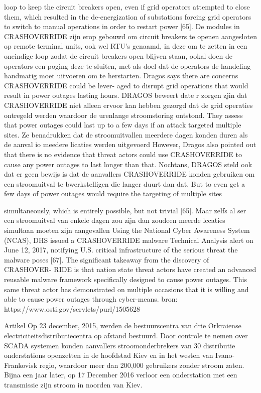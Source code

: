 {loop to keep the circuit breakers open, even if grid operators attempted
to close them, which resulted in the de-energization of substations forcing
grid operators to switch to manual operations in order to restart power
[65]. De modules in CRASHOVERRIDE zijn erop gebouwd om circuit breakers te openen
aangesloten op remote terminal units, ook wel RTU’s genaamd, in deze om te zetten in een
oneindige loop zodat de circuit breakers open blijven staan, ookal doen de operators een
poging deze te sluiten, met als doel dat de operators de handeling handmatig moet uitvoeren
om te herstarten.
Dragos says there are concerns CRASHOVERRIDE could be lever-
aged to disrupt grid operations that would result in power outages lasting
hours. DRAGOS beweert date r zorgen zjin dat CRASHOVERRIDE niet alleen ervoor kan
hebben gezorgd dat de grid operaties ontregeld werden waardoor de urenlange
stroomstoring ontstond.
They assess that power outages could last up to a few days if an attack targeted multiple
sites. Ze benadrukken dat de stroomuitvallen meerdere dagen konden duren als de aanval io
meedere licaties werden uitgevoerd
However, Dragos also pointed out that there is no evidence that threat actors could use
CRASHOVERRIDE to cause any power outages to last longer than that. Nochtans,
DRAGOS steld ook dat er geen bewijs is dat de aanvallers CRASHOVERRIDE konden
gebruiken om een stroomuitval te bwerkstelligen die langer duurt dan dat.
But to even get a few days of power outages would require the targeting of multiple sites

simultaneously, which is entirely possible, but not trivial [65]. Maar zelfs al ser een
stroomuitval van enkele dagen zou zijn dan zoudeen meerde lccaties simultaan moeten zijn
aangevallen
Using the National Cyber Awareness System (NCAS), DHS issued a
CRASHOVERRIDE malware Technical Analysis alert on June 12, 2017, notifying U.S. critical
infrastructure of the serious threat the malware poses [67].
The significant takeaway from the discovery of CRASHOVER-
RIDE is that nation state threat actors have created an advanced reusable
malware framework specifically designed to cause power outages.
This same threat actor has demonstrated on multiple occasions that it is willing and able to
cause power outages through cyber-means.
bron:
https://www.osti.gov/servlets/purl/1505628

Artikel
Op 23 december, 2015, werden de bestuurscentra van drie Orkraiense electriciteitsdistributiecentra
op afstand bestuurd. Door controle te nemen over SCADA systemen konden aanvallers
stroomonderbrekers van 30 distributie onderstations openzetten in de hoofdstad Kiev en in het
westen van Ivano-Frankovisk regio, waardoor meer dan 200,000 gebruikers zonder stroom zaten.
Bijna een jaar later, op 17 December 2016 verloor een onderstation met een transmissie zijn stroom
in noorden van Kiev.

}
